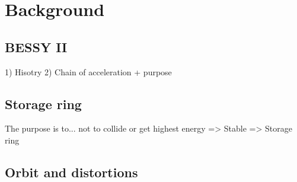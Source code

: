 \section{Background}
\label{sec:background}

\subsection{BESSY II}
1) Hisotry
2) Chain of acceleration + purpose
\subsection{Storage ring}
The purpose is to... not to collide or get highest energy => Stable => Storage ring

\subsection{Orbit and distortions}
